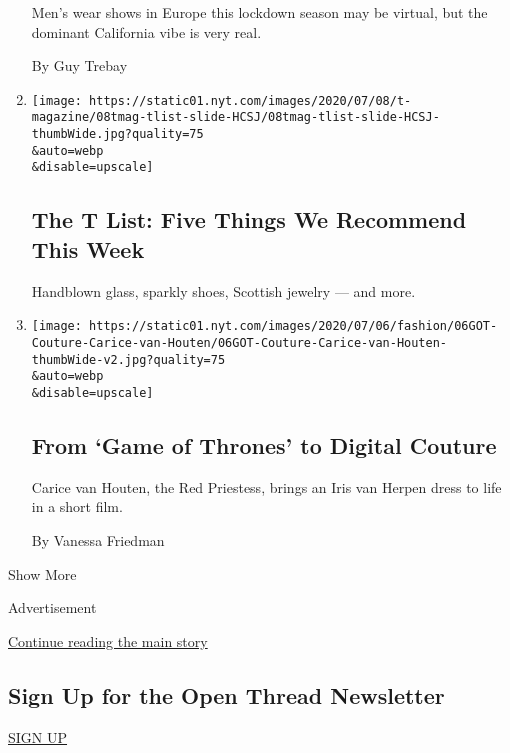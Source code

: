 \begin{enumerate}
  Men's wear shows in Europe this lockdown season may be virtual, but
  the dominant California vibe is very real.

  By Guy Trebay
\item
  \href{/2020/07/09/t-magazine/robert-longo-quarantine-films.html}{}

  \texttt{[image: https://static01.nyt.com/images/2020/07/08/t-magazine/08tmag-tlist-slide-HCSJ/08tmag-tlist-slide-HCSJ-thumbWide.jpg?quality=75\\\&auto=webp\\\&disable=upscale]}

  \hypertarget{the-t-list-five-things-we-recommend-this-week-3}{%
  \subsection{The T List: Five Things We Recommend This
  Week}\label{the-t-list-five-things-we-recommend-this-week-3}}

  Handblown glass, sparkly shoes, Scottish jewelry --- and more.
\item
  \href{/2020/07/06/style/game-of-thrones-iris-van-herpen-couture.html}{}

  \texttt{[image: https://static01.nyt.com/images/2020/07/06/fashion/06GOT-Couture-Carice-van-Houten/06GOT-Couture-Carice-van-Houten-thumbWide-v2.jpg?quality=75\\\&auto=webp\\\&disable=upscale]}

  \hypertarget{from-game-of-thrones-to-digital-couture}{%
  \subsection{From `Game of Thrones' to Digital
  Couture}\label{from-game-of-thrones-to-digital-couture}}

  Carice van Houten, the Red Priestess, brings an Iris van Herpen dress
  to life in a short film.

  By Vanessa Friedman
\end{enumerate}

Show More

Advertisement

\protect\hyperlink{after-mid2}{Continue reading the main story}

\hypertarget{sign-up-for-the-open-thread-newsletter}{%
\subsection{Sign Up for the Open Thread
Newsletter}\label{sign-up-for-the-open-thread-newsletter}}

\href{/newsletters/signup/TZ}{SIGN UP}

